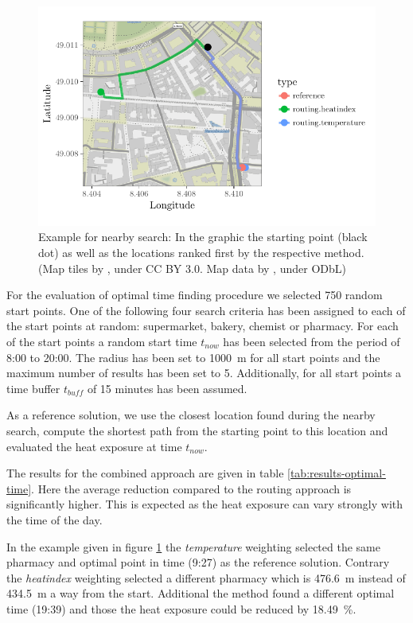 \begin{figure}
	\centering
	\includegraphics[scale=1]{figures/optimaltime_route_example}
	\caption{Example for nearby search: In the graphic the starting point (black dot) as well as the locations ranked first by the respective method. (Map tiles by \textcite{Stamen2017}, under CC BY 3.0. Map data by \textcite{OSMF2016}, under ODbL)}
	\label{fig:optimaltime-route-example}
\end{figure}

For the evaluation of optimal time finding procedure we selected 750 random start points. One of the following four search criteria has been assigned to each of the start points at random: supermarket, bakery, chemist or pharmacy. For each of the start points a random start time $t_{now}$ has been selected from the period of 8:00 to 20:00. The radius has been set to \SI{1000}{\meter} for all start points and the maximum number of results has been set to 5. Additionally, for all start points a time buffer $t_{buff}$ of 15 minutes has been assumed. 

As a reference solution, we use the closest location found during the nearby search, compute the shortest path from the starting point to this location and evaluated the heat exposure at time $t_{now}$. 

The results for the combined approach are given in table \ref{tab:results-optimal-time}. Here the average reduction compared to the routing approach is significantly higher. This is expected as the heat exposure can vary strongly with the time of the day. 

In the example given in figure \ref{fig:optimaltime-route-example} the \emph{temperature} weighting selected the same pharmacy and optimal point in time (9:27) as the reference solution. Contrary the \emph{heatindex} weighting selected a different pharmacy which is \SI{476.6}{\meter} instead of  \SI{434.5}{\meter} a way from the start. Additional the method found a different optimal time (19:39) and those the heat exposure could be reduced by \SI{18.49}{\percent}.  
 
